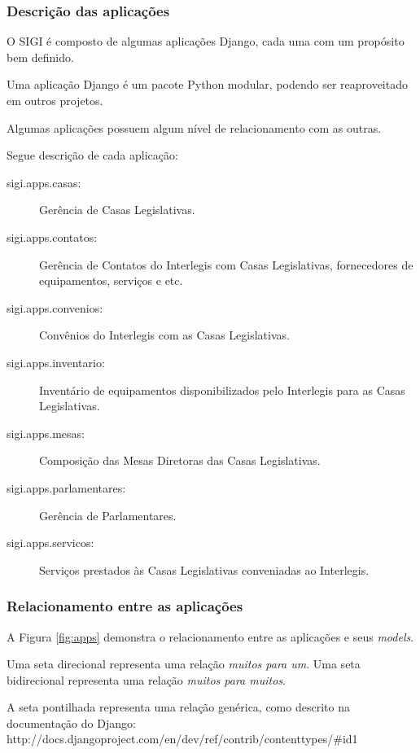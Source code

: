 \subsubsection{Descrição das aplicações}
\label{sec:apps}
O SIGI é composto de algumas aplicações Django, cada uma com um
propósito bem definido.

Uma aplicação Django é um pacote Python modular, podendo ser
reaproveitado em outros projetos.

Algumas aplicações possuem algum nível de relacionamento com as
outras.

Segue descrição de cada aplicação:

\begin{description}
\item[sigi.apps.casas:]
  Gerência de Casas Legislativas.

\item[sigi.apps.contatos:]
  Gerência de Contatos do Interlegis com Casas Legislativas,
  fornecedores de equipamentos, serviços e etc.

\item[sigi.apps.convenios:]
  Convênios do Interlegis com as Casas Legislativas.

\item[sigi.apps.inventario:]
  Inventário de equipamentos disponibilizados pelo Interlegis para as
  Casas Legislativas.

\item[sigi.apps.mesas:]
  Composição das Mesas Diretoras das Casas Legislativas.

\item[sigi.apps.parlamentares:]
  Gerência de Parlamentares.

\item[sigi.apps.servicos:]
  Serviços prestados às Casas Legislativas conveniadas ao Interlegis.
\end{description}

\subsubsection{Relacionamento entre as aplicações}
\label{sec:rel}

A Figura \ref{fig:apps} demonstra o relacionamento entre as
aplicações e seus \emph{models}.

Uma seta direcional representa uma relação \textit{muitos para
  um}. Uma seta bidirecional representa uma relação \textit{muitos
  para muitos}.

A seta pontilhada representa uma relação genérica, como descrito na
documentação do Django:\\
http://docs.djangoproject.com/en/dev/ref/contrib/contenttypes/\#id1


